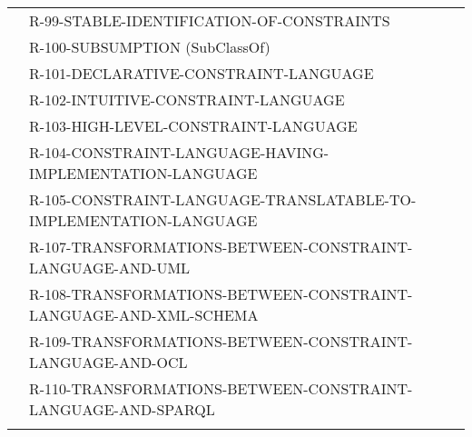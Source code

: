 \documentclass{llncs}
\newcommand{\hr}{\hline\noalign{\smallskip}} %
\begin{document}
\begin{table}
\begin{tabular}{ll}
& R-99-STABLE-IDENTIFICATION-OF-CONSTRAINTS \\
& R-100-SUBSUMPTION (SubClassOf) \\
& R-101-DECLARATIVE-CONSTRAINT-LANGUAGE \\
& R-102-INTUITIVE-CONSTRAINT-LANGUAGE \\
& R-103-HIGH-LEVEL-CONSTRAINT-LANGUAGE \\
& R-104-CONSTRAINT-LANGUAGE-HAVING-IMPLEMENTATION-LANGUAGE \\
& R-105-CONSTRAINT-LANGUAGE-TRANSLATABLE-TO-IMPLEMENTATION-LANGUAGE \\
& R-107-TRANSFORMATIONS-BETWEEN-CONSTRAINT-LANGUAGE-AND-UML \\
& R-108-TRANSFORMATIONS-BETWEEN-CONSTRAINT-LANGUAGE-AND-XML-SCHEMA \\
& R-109-TRANSFORMATIONS-BETWEEN-CONSTRAINT-LANGUAGE-AND-OCL \\
& R-110-TRANSFORMATIONS-BETWEEN-CONSTRAINT-LANGUAGE-AND-SPARQL \\
\hr
\end{tabular}
\end{table}
\end{document}
